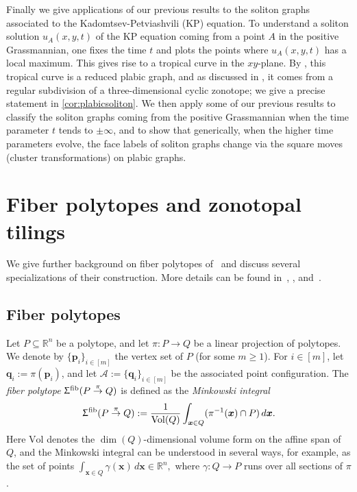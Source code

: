 \documentclass[11pt]{amsart}
\theoremstyle{plain}
\theoremstyle{definition}
\def\R{\mathbb{R}}
\def\x{{\bm{x}}}
\def\p{{\bm{p}}}
\def\q{{\bm{q}}}
\def\Acal{\mathcal{A}}
\def\Vol{\mathrm{Vol}}
\def\fiber{{\operatorname{fib}}}
\def\FibPoly{\Upsigma^\fiber}
\def\pito{\overset \pi \to}
\let\subset\subseteq
\begin{document}
Finally we give applications of our previous results to the soliton graphs
\cite{KW, KW2, KK}
associated to 
 the Kadomtsev-Petviashvili (KP) equation. 
 To understand a soliton solution
$u_A(x,y,t)$ of the KP equation coming from a point $A$ in the positive Grassmannian,
one fixes the time $t$ and plots the points
where $u_A(x,y,t)$ has a local maximum.  This gives rise to a tropical curve
in the $xy$-plane.
By \cite{KW, KW2},
this tropical curve is a reduced plabic graph, and 
as discussed in \cite[Section 2.3]{KK}, it comes from a regular subdivision of 
a three-dimensional cyclic zonotope; we give a precise statement in 
\cref{cor:plabicsoliton}. 
 We then apply some of our previous results to classify the soliton 
graphs coming from the positive Grassmannian when the
time parameter $t$ tends to $\pm \infty$, and to show that 
generically, when the higher time parameters evolve, the 
face labels of soliton graphs change via
the square moves (cluster transformations) on plabic graphs.




\section{Fiber polytopes and zonotopal tilings}

We give further background on fiber polytopes of~\cite{BS} and discuss several specializations of their construction. More details can be found in~\cite{BS}, \cite[Chapter~7]{GKZ}, and~\cite[Lecture~9]{Ziegler}.


\subsection{Fiber polytopes}\label{sec:fiber-polytopes}

Let $P \subset \R^n$ be a polytope, and let 
$\pi:P\to Q$ be a linear projection of polytopes.  
We denote by $\{\p_i\}_{i\in [m]}$ the vertex set of $P$ (for some $m\geq1$). For $i\in [m]$, let $\q_i:=\pi(\p_i)$, and let $\Acal:=\{\q_i\}_{i\in[m]}$ be the associated point configuration. The \emph{fiber polytope} $\FibPoly(P\pito Q)$ is defined
as the \emph{Minkowski integral}
$$
\FibPoly(P\pito Q):=
\frac{1}{\Vol(Q)}\int_{\x\in Q}  (\pi^{-1}(\x)\cap P)\, d\x.
$$
\noindent Here $\Vol$ denotes the $\dim(Q)$-dimensional volume form on the affine span of $Q$, and the Minkowski integral can be understood in several ways,
for example, as the set of points $\int_{\x\in Q} \gamma(\x)\, d\x\in \R^n,$
where $\gamma:Q\to P$ runs over all sections of $\pi$ \cite{BS, BS2}.
\end{document}
